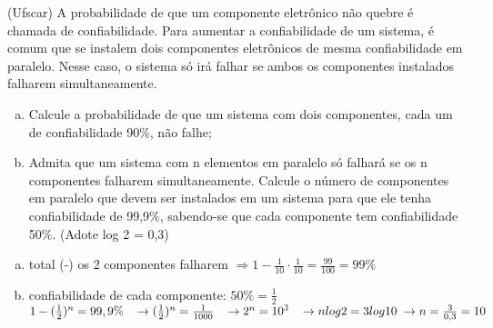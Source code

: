 \begin{ex}
(Ufscar) A probabilidade de que um componente eletrônico não quebre é chamada de confiabilidade.  Para aumentar a confiabilidade de um sistema, é comum que se instalem dois componentes eletrônicos de mesma confiabilidade em paralelo. Nesse caso, o sistema só irá falhar se ambos os componentes instalados falharem simultaneamente.
  \begin{center}
  \end{center}

   \begin{enumerate}[(a)]
   \item	Calcule a probabilidade de que um sistema com dois componentes, cada um de confiabilidade 90\%, não falhe;
   \item	Admita que um sistema com n elementos em paralelo só falhará se os n componentes falharem simultaneamente.  Calcule o número de componentes em paralelo que devem ser instalados em um sistema para que ele tenha confiabilidade de 99,9\%, sabendo-se que cada componente tem confiabilidade 50\%.                       (Adote log 2 = 0,3)
   \end{enumerate}
     \begin{sol}
      \phantom{A} 
      \begin{enumerate} [(a)]
          \item total (-) os 2 componentes falharem $\Longrightarrow 1 - \frac{1}{10}\cdot\frac{1}{10}=\frac{99}{100}=99\%$ 
          \item confiabilidade de cada componente: $50\% = \frac{1}{2}$\\  $1-(\frac{1}{2})^n = 99,9\% \hspace{0,3cm} \rightarrow (\frac{1}{2})^n=\frac{1}{1000} \hspace{0,3cm} \rightarrow 2^n={10}^3 \hspace{0,3cm} \rightarrow nlog2=3log 10\hspace{0,1cm} \rightarrow n=\frac{3}{0,3}=10 $
          
      \end{enumerate}
     \end{sol}
\end{ex}